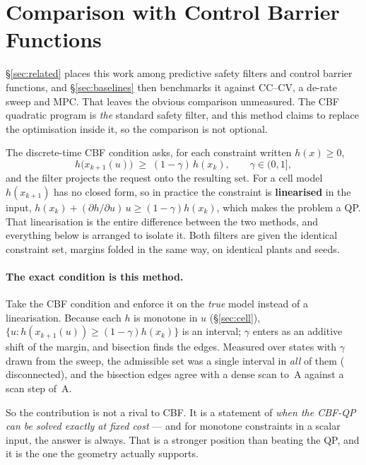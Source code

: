 \documentclass[11pt,letterpaper]{article}
\theoremstyle{definition}
\theoremstyle{remark}
\begin{document}
\section{Comparison with Control Barrier Functions}\label{sec:cbf}

\S\ref{sec:related} places this work among predictive safety filters and control barrier
functions, and \S\ref{sec:baselines} then benchmarks it against CC--CV, a de-rate sweep and MPC.
That leaves the obvious comparison unmeasured. The CBF quadratic program is \emph{the} standard
safety filter, and this method claims to replace the optimisation inside it, so the comparison
is not optional.

The discrete-time CBF condition \cite{agrawal2017dcbf} asks, for each constraint written
$h(x) \ge 0$,
\begin{equation}
h\bigl(x_{k+1}(u)\bigr) \;\ge\; (1-\gamma)\,h(x_k), \qquad \gamma \in (0,1],
\end{equation}
and the filter projects the request onto the resulting set. For a cell model $h(x_{k+1})$ has no
closed form, so in practice the constraint is \textbf{linearised} in the input,
$h(x_k) + (\partial h/\partial u)\,u \ge (1-\gamma) h(x_k)$, which makes the problem a QP. That
linearisation is the entire difference between the two methods, and everything below is arranged
to isolate it. Both filters are given the identical constraint set, margins folded in the same
way, on identical plants and seeds.

\paragraph{The exact condition is this method.} Take the CBF condition and enforce it on the
\emph{true} model instead of a linearisation. Because each $h$ is monotone in $u$
(\S\ref{sec:cell}), $\{u : h(x_{k+1}(u)) \ge (1-\gamma)h(x_k)\}$ is an interval; $\gamma$ enters
as an additive shift of the margin, and bisection finds the edges. Measured over
\cExactStates{} states with $\gamma$ drawn from the sweep, the admissible set was a single
interval in \emph{all} of them (\cExactDisc{} disconnected), and the bisection edges agree with a
dense scan to \cExactDev\,A against a scan step of \cExactScan\,A.

So the contribution is not a rival to CBF. It is a statement of \emph{when the CBF-QP can be
solved exactly at fixed cost} --- and for monotone constraints in a scalar input, the answer is
always. That is a stronger position than beating the QP, and it is the one the geometry actually
supports.
\end{document}
